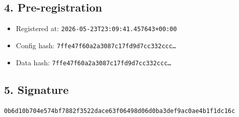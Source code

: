 \documentclass{article}
\begin{document}
\subsection*{4. Pre-registration}
\begin{itemize}
\item Registered at: \texttt{2026-05-23T23:09:41.457643+00:00}
\item Config hash: \texttt{7ffe47f60a2a3087c17fd9d7cc332ccc\dots}
\item Data hash: \texttt{7ffe47f60a2a3087c17fd9d7cc332ccc\dots}
\end{itemize}
\subsection*{5. Signature}
\texttt{0b6d10b704e574bf7882f3522dace63f06498d06d0ba3def9ac0ae4b1f1dc16c}\\
\end{document}
